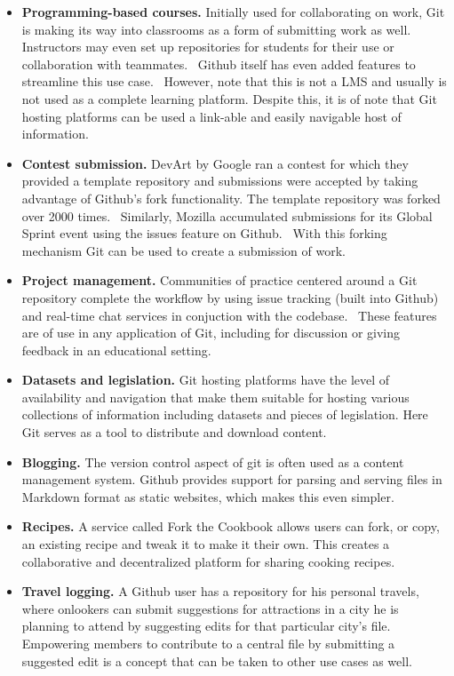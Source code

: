 \documentclass[12pt,twoside]{mitthesis}
\begin{document}
{\begin{itemize}
\item \textbf{Programming-based courses.} Initially used for collaborating on work, Git is making its way into classrooms as a form of submitting work as well. Instructors may even set up repositories for students for their use or collaboration with teammates.~\cite{whygithubclassroom} Github itself has even added features to streamline this use case.~\cite{githubclassroom} However, note that this is not a LMS and usually is not used as a complete learning platform. Despite this, it is of note that Git hosting platforms can be used a link-able and easily navigable host of information.
\item \textbf{Contest submission.} DevArt by Google ran a contest for which they provided a template repository and submissions were accepted by taking advantage of Github's fork functionality. The template repository was forked over 2000 times.~\cite{devart} Similarly, Mozilla accumulated submissions for its Global Sprint event using the issues feature on Github.~\cite{globalsprint} With this forking mechanism Git can be used to create a submission of work.
\item \textbf{Project management.} Communities of practice centered around a Git repository complete the workflow by using issue tracking (built into Github) and real-time chat services in conjuction with the codebase.~\cite{githubpm} These features are of use in any application of Git, including for discussion or giving feedback in an educational setting.
\item \textbf{Datasets and legislation.} Git hosting platforms have the level of availability and navigation that make them suitable for hosting various collections of information including datasets and pieces of legislation. Here Git serves as a tool to distribute and download content.~\cite{sevenwaysgit}
\item \textbf{Blogging.} The version control aspect of git is often used as a content management system. Github provides support for parsing and serving files in Markdown format as static websites, which makes this even simpler.~\cite{whygithubclassroom}
\item \textbf{Recipes.} A service called Fork the Cookbook allows users can fork, or copy, an existing recipe and tweak it to make it their own. This creates a collaborative and decentralized platform for sharing cooking recipes.~\cite{forkthecookbook}
\item \textbf{Travel logging.} A Github user has a repository for his personal travels, where onlookers can submit suggestions for attractions in a city he is planning to attend by suggesting edits for that particular city's file.~\cite{travellog} Empowering members to contribute to a central file by submitting a suggested edit is a concept that can be taken to other use cases as well.
\end{itemize}
}
\end{document}
